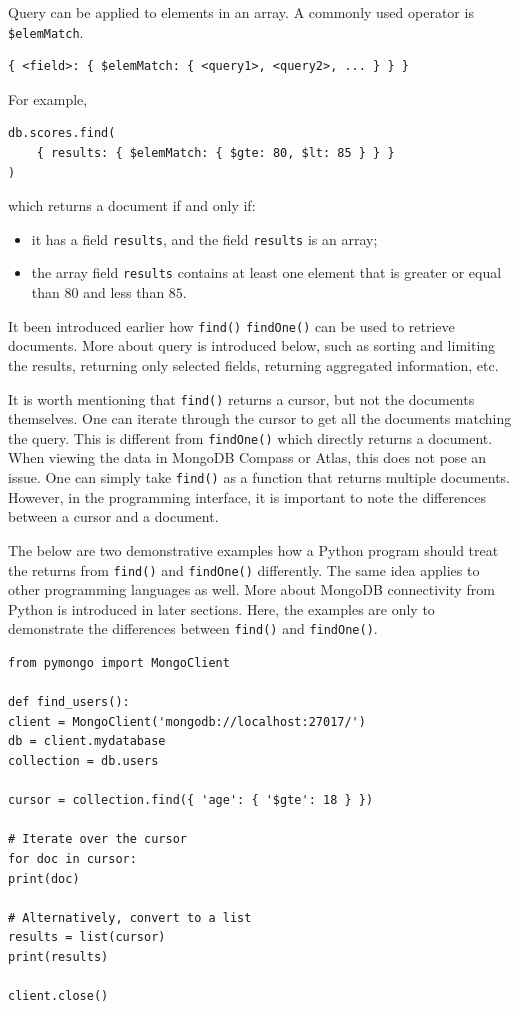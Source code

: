 Query can be applied to elements in an array. A commonly used operator is \verb|$elemMatch|.
\begin{lstlisting}
{ <field>: { $elemMatch: { <query1>, <query2>, ... } } }
\end{lstlisting}
For example,
\begin{lstlisting}
db.scores.find(
	{ results: { $elemMatch: { $gte: 80, $lt: 85 } } }
)
\end{lstlisting}
which returns a document if and only if: 
\begin{itemize}
	\item it has a field \verb|results|, and the field \verb|results| is an array;
	\item the array field \verb|results| contains at least one element that is greater or equal than $80$ and less than $85$.
\end{itemize}

It been introduced earlier how \verb|find()| \verb|findOne()| can be used to retrieve documents. More about query is introduced below, such as sorting and limiting the results, returning only selected fields, returning aggregated information, etc.

It is worth mentioning that \verb|find()| returns a cursor, but not the documents themselves. One can iterate through the cursor to get all the documents matching the query. This is different from \verb|findOne()| which directly returns a document. When viewing the data in MongoDB Compass or Atlas, this does not pose an issue. One can simply take \verb|find()| as a function that returns multiple documents. However, in the programming interface, it is important to note the differences between a cursor and a document.

The below are two demonstrative examples how a Python program should treat the returns from \verb|find()| and \verb|findOne()| differently. The same idea applies to other programming languages as well. More about MongoDB connectivity from Python is introduced in later sections. Here, the examples are only to demonstrate the differences between \verb|find()| and \verb|findOne()|.

\begin{lstlisting}
from pymongo import MongoClient

def find_users():
client = MongoClient('mongodb://localhost:27017/')
db = client.mydatabase
collection = db.users

cursor = collection.find({ 'age': { '$gte': 18 } })

# Iterate over the cursor
for doc in cursor:
print(doc)

# Alternatively, convert to a list
results = list(cursor)
print(results)

client.close()
\end{lstlisting}

